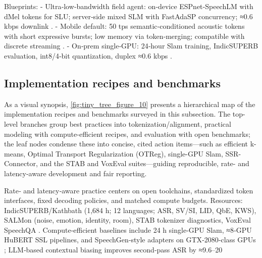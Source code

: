 \documentclass{article}
\begin{document}
Blueprints:
- Ultra‑low‑bandwidth field agent: on‑device ESPnet‑SpeechLM with dMel tokens for SLU; server‑side mixed SLM with FastAdaSP concurrency; ≈0.6 kbps downlink \cite{bai2025dmelspeechtokenizationmadesimple,tian2025espnetspeechlmopenspeechlanguagemodeltoo,entry2025indicsuperbspeechprocessinguniversalperf,lu2024fastadaspmultitaskadaptedefficientinfere}.
- Mobile default: 50 tps semantic‑conditioned acoustic tokens with short expressive bursts; low memory via token‑merging; compatible with discrete streaming \cite{mousavi2024dasbdiscreteaudiospeechbenchmark,yang2025diffsoundstreamefficientspeechtokenizati,lu2024fastadaspmultitaskadaptedefficientinfere,zhao2024textlessstreamingspeechtranslationsemant}.
- On‑prem single‑GPU: 24‑hour Slam training, IndicSUPERB evaluation, int8/4‑bit quantization, duplex ≈0.6 kbps \cite{maimon2025slammingtrainingspeechlanguagemodelonegp,entry2025indicsuperbspeechprocessinguniversalperf,dao2025ichigomixedmodalearlyfusionrealtimevoice}.

\subsection{Implementation recipes and benchmarks} \label{subsec:Implementation recipes and benchmarks}
As a visual synopsis, \autoref{fig:tiny_tree_figure_10} presents a hierarchical map of the implementation recipes and benchmarks surveyed in this subsection. The top-level branches group best practices into tokenization/alignment, practical modeling with compute-efficient recipes, and evaluation with open benchmarks; the leaf nodes condense these into concise, cited action items—such as efficient k-means, Optimal Transport Regularization (OTReg), single-GPU Slam, SSR-Connector, and the STAB and VoxEval suites—guiding reproducible, rate- and latency-aware development and fair reporting.

Rate‑ and latency‑aware practice centers on open toolchains, standardized token interfaces, fixed decoding policies, and matched compute budgets. Resources: IndicSUPERB/Kathbath (1,684 h; 12 languages; ASR, SV/SI, LID, QbE, KWS), SALMon (noise, emotion, identity, room), STAB tokenizer diagnostics, VoxEval SpeechQA \cite{entry2025indicsuperbspeechprocessinguniversalperf,maimon2025salmonsuiteacousticlanguagemodelevaluati,vashishth2024stabspeechtokenizerassessmentbenchmark,cui2025voxevalbenchmarkingknowledgeunderstandin}. Compute‑efficient baselines include 24 h single‑GPU Slam, ≈8‑GPU HuBERT SSL pipelines, and SpeechGen‑style adapters on GTX‑2080‑class GPUs \cite{maimon2025slammingtrainingspeechlanguagemodelonegp,chen2023reducingbarriersselfsupervisedlearninghu,wu2023speechgenunlockinggenerativepowerspeechl}; LLM‑based contextual biasing improves second‑pass ASR by ≈9.6–20%
\end{document}
